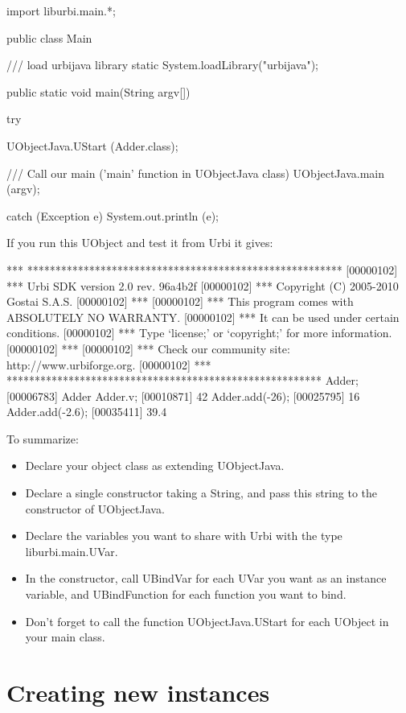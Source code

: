 \begin{itemize}
\begin{cxx}
import liburbi.main.*;

public class Main {

    /// load urbijava library
    static {
        System.loadLibrary("urbijava");
    }

    public static void main(String argv[]) {
        try
        {
            UObjectJava.UStart (Adder.class);

	    /// Call our main ('main' function in UObjectJava class)
            UObjectJava.main (argv);
        }
        catch (Exception e)
        {
            System.out.println (e);
        }
    }
}
\end{cxx}
\end{itemize}

If you run this UObject and test it from Urbi it gives:

\begin{cxx}
[00000102] *** ********************************************************
[00000102] *** Urbi SDK version 2.0 rev. 96a4b2f
[00000102] *** Copyright (C) 2005-2010 Gostai S.A.S.
[00000102] ***
[00000102] *** This program comes with ABSOLUTELY NO WARRANTY.
[00000102] *** It can be used under certain conditions.
[00000102] *** Type `license;' or `copyright;' for more information.
[00000102] ***
[00000102] *** Check our community site: http://www.urbiforge.org.
[00000102] *** ********************************************************
Adder;
[00006783] Adder
Adder.v;
[00010871] 42
Adder.add(-26);
[00025795] 16
Adder.add(-2.6);
[00035411] 39.4
\end{cxx}

To summarize:

\begin{itemize}
\item Declare your object class as extending UObjectJava.
\item Declare a single constructor taking a String, and pass this string to
  the constructor of UObjectJava.
\item Declare the variables you want to share with Urbi with the type
  liburbi.main.UVar.
\item In the constructor, call UBindVar for each UVar you want as an
  instance variable, and UBindFunction for each function you want to bind.
\item Don't forget to call the function UObjectJava.UStart for each UObject
  in your main class.
\end{itemize}

\section{Creating new instances}
\label{sec:uob:apijava:new}

